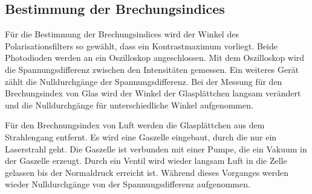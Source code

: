 \subsection{Bestimmung der Brechungsindices}
Für die Bestimmung der Brechungsindices wird der
Winkel des Polarisationsfilters so gewählt, dass ein Kontrastmaximum vorliegt.
Beide Photodioden werden an ein Oszilloskop angeschlossen.
Mit dem Oszilloskop wird die Spannungsdifferenz zwischen den Intensitäten
gemessen. Ein weiteres Gerät zählt die Nulldurchgänge der Spannungsdifferenz.
Bei der Messung für den Brechungsindex von Glas wird
der Winkel der Glasplättchen langsam verändert und die Nulldurchgänge für unterschiedliche
Winkel aufgenommen.

Für den Brechnungsindex von Luft werden die Glasplättchen
aus dem Strahlengang entfernt. Es wird eine Gaszelle eingebaut, durch
die nur ein Laserstrahl geht. Die Gaszelle ist verbunden mit einer Pumpe,
die ein Vakuum in der Gaszelle erzeugt. Durch ein Ventil wird wieder langsam
Luft in die Zelle gelassen bis der Normaldruck erreicht ist. Während
dieses Vorganges werden wieder Nulldurchgänge von der Spannungsdifferenz aufgenommen.
